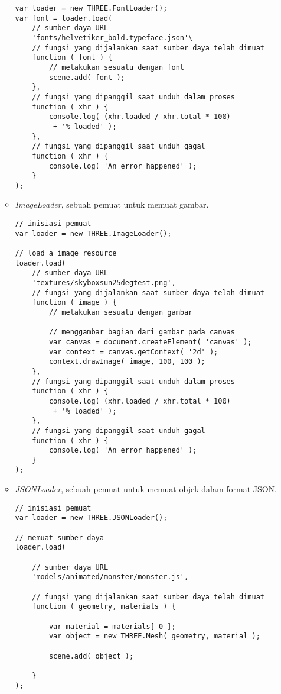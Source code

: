 \begin{itemize}
\begin{itemize}
\begin{lstlisting}
var loader = new THREE.FontLoader();
var font = loader.load(
	// sumber daya URL
	'fonts/helvetiker_bold.typeface.json'\
	// fungsi yang dijalankan saat sumber daya telah dimuat
	function ( font ) {
		// melakukan sesuatu dengan font
		scene.add( font );
	},
	// fungsi yang dipanggil saat unduh dalam proses
	function ( xhr ) {
		console.log( (xhr.loaded / xhr.total * 100)
		 + '% loaded' );
	},
	// fungsi yang dipanggil saat unduh gagal
	function ( xhr ) {
		console.log( 'An error happened' );
	}
);
\end{lstlisting}

	\item {\it ImageLoader}, sebuah pemuat untuk memuat gambar.
	
\begin{lstlisting}
// inisiasi pemuat
var loader = new THREE.ImageLoader();

// load a image resource
loader.load(
	// sumber daya URL
	'textures/skyboxsun25degtest.png',
	// fungsi yang dijalankan saat sumber daya telah dimuat
	function ( image ) {
		// melakukan sesuatu dengan gambar

		// menggambar bagian dari gambar pada canvas
		var canvas = document.createElement( 'canvas' );
		var context = canvas.getContext( '2d' );
		context.drawImage( image, 100, 100 );
	},
	// fungsi yang dipanggil saat unduh dalam proses
	function ( xhr ) {
		console.log( (xhr.loaded / xhr.total * 100)
		 + '% loaded' );
	},
	// fungsi yang dipanggil saat unduh gagal
	function ( xhr ) {
		console.log( 'An error happened' );
	}
);
\end{lstlisting}

	\item {\it JSONLoader}, sebuah pemuat untuk memuat objek dalam format JSON.
	
\begin{lstlisting}
// inisiasi pemuat
var loader = new THREE.JSONLoader();

// memuat sumber daya
loader.load(

	// sumber daya URL
	'models/animated/monster/monster.js',

	// fungsi yang dijalankan saat sumber daya telah dimuat
	function ( geometry, materials ) {

		var material = materials[ 0 ];
		var object = new THREE.Mesh( geometry, material );

		scene.add( object );

	}
);
\end{lstlisting}


\end{itemize}
\end{itemize}
